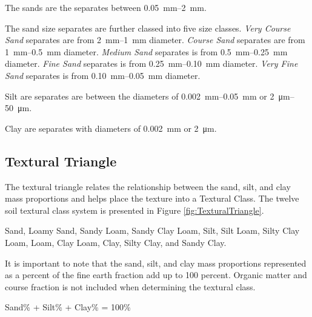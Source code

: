 \documentclass{article}
\begin{document}
The sands are the separates between \qtyrange{0.05}{2}{mm}.

The sand size separates are further classed into five size classes. \textit{Very Course Sand} separates are from \qtyrange{2}{1}{mm} diameter. \textit{Course Sand} separates are from \qtyrange{1}{0.5}{mm} diameter. \textit{Medium Sand} separates is from \qtyrange{0.5}{0.25}{mm} diameter. \textit{Fine Sand} separates is from \qtyrange{0.25}{0.10}{mm} diameter. \textit{Very Fine Sand} separates is from \qtyrange{0.10}{0.05}{mm} diameter.
    
Silt are separates are between the diameters of \qtyrange{0.002}{0.05}{mm} or \qtyrange{2}{50}{\micro\metre}.

Clay are separates with diameters of \qty{0.002}{mm} or \qty{2}{\micro\metre}.

\subsection{Textural Triangle}
    
The textural triangle relates the relationship between the sand, silt, and clay mass proportions and helps place the texture into a Textural Class. The twelve soil textural class system is presented in Figure \ref{fig:TexturalTriangle}.
    
Sand, Loamy Sand, Sandy Loam, Sandy Clay Loam, Silt, Silt Loam, Silty Clay Loam, Loam, Clay Loam, Clay, Silty Clay, and Sandy Clay.
    
It is important to note that the sand, silt, and clay mass proportions represented as a percent of the fine earth fraction add up to 100 percent. Organic matter and course fraction is not included when determining the textural class.
    
\begin{center}
Sand\% + Silt\% + Clay\% = 100\%
\end{center}
    
    
\end{document}
